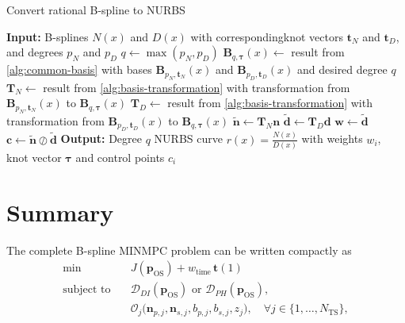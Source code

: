 \begin{algorithm}
    \caption{Convert rational B-spline to NURBS}\label{alg:nurbs-conversion}
    \begin{algorithmic}[1]
        \State \textbf{Input:} B-splines $N(x)$ and $D(x)$ with correspondingknot vectors $\mathbf t_N$ and $\mathbf t_D$, and degrees $p_N$ and $p_D$
        \State $q \gets \max(p_N, p_D)$
        \State $\mathbf B_{q,\boldsymbol{\tau}}(x) \gets $ result from \cref{alg:common-basis} with bases $\mathbf B_{p_N,\mathbf t_N}(x)$ and $\mathbf B_{p_D,\mathbf t_D}(x)$ and desired degree $q$
        \State $\mathbf T_N \gets $ result from \cref{alg:basis-transformation} with transformation from $\mathbf B_{p_N,\mathbf t_N}(x)$ to $\mathbf B_{q,\boldsymbol{\tau}}(x)$
        \State $\mathbf T_D \gets $ result from \cref{alg:basis-transformation} with transformation from $\mathbf B_{p_D,\mathbf t_D}(x)$ to $\mathbf B_{q,\boldsymbol{\tau}}(x)$
        \State $\mathbf{\tilde n} \gets \mathbf T_N \mathbf n$
        \State $\mathbf{\tilde d} \gets \mathbf T_D \mathbf d$
        \State $\mathbf w \gets \mathbf{\tilde d}$
        \State $\mathbf c \gets \mathbf{\tilde n} \oslash \mathbf{\tilde d}$ 
        \State \textbf{Output:} Degree $q$ NURBS curve $\displaystyle r(x) = \frac{N(x)}{D(x)}$ with weights $w_i$, knot vector $\boldsymbol{\tau}$ and control points $c_i$
    \end{algorithmic}
\end{algorithm}








\section{Summary}

The complete B-spline MINMPC problem can be written compactly as
\begin{equation}
\label{eq:minmpc-compact}
    \begin{aligned}
        \min
        \quad & J(\mathbf p_\text{OS}) + w_\text{time}\, \mathbf t(1)
        \\
        \text{subject to}\quad
        & \mathcal{D}_{DI}(\mathbf{p}_\text{OS})
        \text{ or }
        \mathcal{D}_{PH}(\mathbf{p}_\text{OS}),
        \\
        & \mathcal{O}_j\bigl(
            \mathbf{n}_{p,j}, \mathbf{n}_{s,j}, b_{p,j}, b_{s,j}, z_j
        \bigr),
        \quad \forall j\in \{1,\ldots,N_\text{TS}\},
    \end{aligned}
\end{equation}

